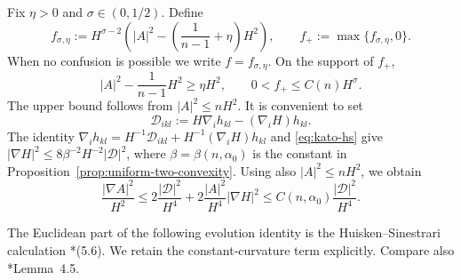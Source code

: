 \documentclass[11pt,reqno]{amsart}
\theoremstyle{definition}
\theoremstyle{remark}
\numberwithin{equation}{section}
\begin{document}
Fix $\eta>0$ and $\sigma\in(0,1/2)$.  Define
\begin{equation*}
  f_{\sigma,\eta}
  :=H^{\sigma-2}\left(|A|^2-\left(\frac{1}{n-1}+\eta\right)H^2\right),
  \qquad f_+:=\max\{f_{\sigma,\eta},0\}.
\end{equation*}
When no confusion is possible we write $f=f_{\sigma,\eta}$.  On the support of
$f_+$,
\begin{equation*}
  |A|^2-\frac{1}{n-1}H^2\geq \eta H^2,
  \qquad 0<f_+\leq C(n)H^\sigma.
\end{equation*}
The upper bound follows from $|A|^2\le nH^2$.  It is convenient to set
\begin{equation}\label{eq:relative-gradient-tensor}
 \mathcal D_{ikl}:=H\nabla_i h_{kl}-(\nabla_iH)h_{kl}.
\end{equation}
The identity
$\nabla_i h_{kl}=H^{-1}\mathcal D_{ikl}
+H^{-1}(\nabla_iH)h_{kl}$ and \eqref{eq:kato-hs} give
$|\nabla H|^2\leq8\beta^{-2}H^{-2}|\mathcal D|^2$, where
$\beta=\beta(n,\alpha_0)$ is the constant in
Proposition~\ref{prop:uniform-two-convexity}.  Using also
$|A|^2\leq nH^2$, we obtain
\begin{equation}\label{eq:D-controls-gradient}
 \frac{|\nabla A|^2}{H^2}
 \leq 2\frac{|\mathcal D|^2}{H^4}
 +2\frac{|A|^2}{H^4}|\nabla H|^2
 \leq C(n,\alpha_0)\frac{|\mathcal D|^2}{H^4}.
\end{equation}

The Euclidean part of the following evolution identity is the
Huisken--Sinestrari calculation \cite{HS09}*{(5.6)}.  We retain the
constant-curvature term explicitly.  Compare also
\cite{LN21}*{Lemma~4.5}.
\end{document}
